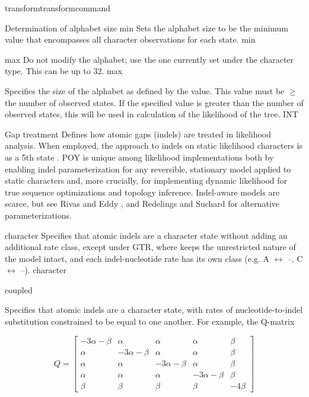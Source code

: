 \begin{command}{transform}{transformcommand}
\begin{arguments}
\begin{argumentgroup}{Determination of alphabet size}
 {\obligatory min}
{Sets the alphabet size to be the minimum value that
encompasses all character observations for each state.}
{min}

 {\obligatory max}
{Do not modify the alphabet; use the one currently
set under the character type. This can be up to 32.}%
{max}

 {\obligatory{\poyint}}
{Specifies the size of the alphabet as defined by the \poyint value. 
This value must be $ \geq $ the number of observed states.
If the specified value is greater than the number of observed states, 
this \poyint will be used in calculation of the likelihood of the tree.}
{INT}

\end{argumentgroup}

\begin {argumentgroup} {Gap treatment}
Defines how atomic gaps (indels) are treated in
likelihood analysis. When employed, the \poy approach to
indels on static likelihood characters is as a 5th state 
\cite{mcguire2001models,Wheeler2006}. 
POY is unique among likelihood implementations both
by enabling indel parameterization for any reversible,
stationary model applied to static characters and, more
crucially, for implementing dynamic likelihood for true
sequence optimizations and topology inference. Indel-aware
models are scarce, but see Rivas and Eddy \cite{rivas2008probabilistic}, 
and Redelings and Suchard \cite{redelings2005joint,redelings2007incorporating}
for alternative parameterizations.

 {\obligatory character}
{Specifies that atomic indels are a character state
without adding an additional rate class, except
under GTR, where \poy keeps the unrestricted nature of the
model intact, and each indel-nucleotide rate has its
own class (e.g. A $\leftrightarrow$ --, C $\leftrightarrow$ --).}
{character}

 {\obligatory coupled}
{Specifies that atomic indels are a character state,
with rates of nucleotide-to-indel substitution
constrained to be equal to one another. For example,
the Q-matrix

\begin{equation*}
Q =
\begin{bmatrix}
-3 \alpha - \beta & \alpha & \alpha & \alpha & \beta \\
\alpha & -3 \alpha - \beta & \alpha & \alpha & \beta \\
\alpha & \alpha & -3 \alpha - \beta & \alpha & \beta \\
\alpha & \alpha & \alpha & -3 \alpha - \beta & \beta \\
\beta & \beta & \beta & \beta & -4 \beta
\end{bmatrix}
\end{equation*}

}
\end{argumentgroup}
\end{arguments}
\end{command}
